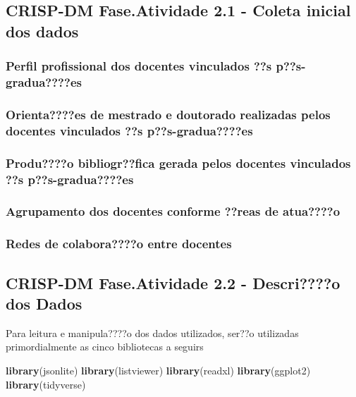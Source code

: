 \documentclass[]{article}
\newenvironment{Shaded}{\begin{snugshade}}{\end{snugshade}}
\newcommand{\KeywordTok}[1]{\textcolor[rgb]{0.13,0.29,0.53}{\textbf{#1}}}
\newcommand{\NormalTok}[1]{#1}
\begin{document}
\subsection{CRISP-DM Fase.Atividade 2.1 - Coleta inicial dos
dados}\label{crisp-dm-fase.atividade-2.1---coleta-inicial-dos-dados}

\subsubsection{Perfil profissional dos docentes vinculados ??s
p??s-gradua????es}\label{perfil-profissional-dos-docentes-vinculados-s-ps-graduaes}

\subsubsection{Orienta????es de mestrado e doutorado realizadas pelos
docentes vinculados ??s
p??s-gradua????es}\label{orientaes-de-mestrado-e-doutorado-realizadas-pelos-docentes-vinculados-s-ps-graduaes}

\subsubsection{Produ????o bibliogr??fica gerada pelos docentes
vinculados ??s
p??s-gradua????es}\label{produo-bibliogrfica-gerada-pelos-docentes-vinculados-s-ps-graduaes}

\subsubsection{Agrupamento dos docentes conforme ??reas de
atua????o}\label{agrupamento-dos-docentes-conforme-reas-de-atuao}

\subsubsection{Redes de colabora????o entre
docentes}\label{redes-de-colaborao-entre-docentes}

\subsection{CRISP-DM Fase.Atividade 2.2 - Descri????o dos
Dados}\label{crisp-dm-fase.atividade-2.2---descrio-dos-dados}

Para leitura e manipula????o dos dados utilizados, ser??o utilizadas
primordialmente as cinco bibliotecas a seguirs

\begin{Shaded}
\begin{Highlighting}[]
\KeywordTok{library}\NormalTok{(jsonlite)}
\KeywordTok{library}\NormalTok{(listviewer)}
\KeywordTok{library}\NormalTok{(readxl)}
\KeywordTok{library}\NormalTok{(ggplot2)}
\KeywordTok{library}\NormalTok{(tidyverse)}
\end{Highlighting}
\end{Shaded}
\end{document}
